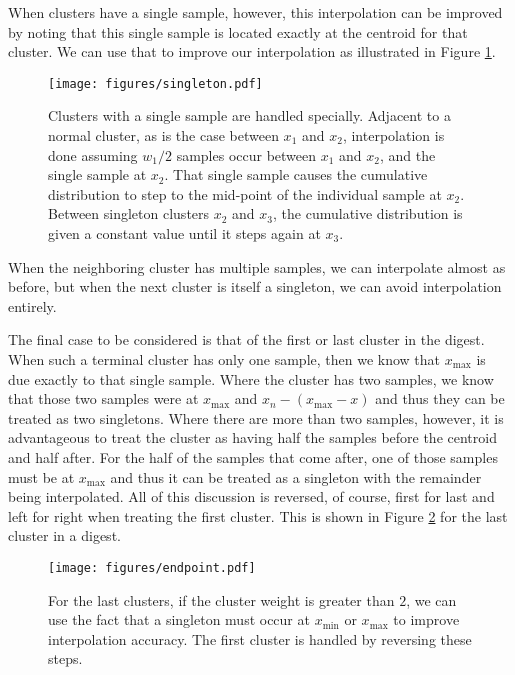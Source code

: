 \documentclass[]{statsoc}
\begin{document}
When clusters have a single sample, however, this interpolation can be improved by noting that this single sample is located exactly at the centroid for that cluster. We can use that to improve our interpolation as illustrated in Figure \ref{fig:singletons}. 
\begin{figure}[tb] %
   \centering
   \texttt{[image: figures/singleton.pdf]} 
   \caption{Clusters with a single sample are handled specially. Adjacent to a normal cluster, as is the case between $x_1$ and $x_2$, interpolation is done assuming $w_1/2$ samples occur between $x_1$ and $x_2$, and the single sample at $x_2$. That single sample causes the cumulative distribution to step to the mid-point of the individual sample at $x_2$. Between singleton clusters $x_2$ and $x_3$, the cumulative distribution is given a constant value until it steps again at $x_3$.}
   \label{fig:singletons}
\end{figure}
When the neighboring cluster has multiple samples, we can interpolate almost as before, but when the next cluster is itself a singleton, we can avoid interpolation entirely. 

The final case to be considered is that of the first or last cluster in the digest. 
When such a terminal cluster has only one sample, then we know that $x_{\mathrm {max}}$ is due exactly to that single sample. Where the cluster has two samples, we know that those two samples were at $x_{\mathrm {max}}$ and $x_n-(x_{\mathrm {max}}-x)$ and thus they can be treated as two singletons. Where there are more than two samples, however, it is advantageous to treat the cluster as having half the samples before the centroid and half after. For the half of the samples that come after, one of those samples must be at $x_{\mathrm {max}}$ and thus it can be treated as a singleton with the remainder being interpolated. All of this discussion is reversed, of course, first for last and left for right when treating the first cluster. This is shown in Figure \ref{fig:endpoint} for the last cluster in a digest.
\begin{figure}[htb] %
   \centering
   \texttt{[image: figures/endpoint.pdf]} 
   \caption{For the last clusters, if the cluster weight is greater than $2$, we can use the fact that a singleton must occur at $x_{\mathrm {min}}$ or $x_{\mathrm {max}}$ to improve interpolation accuracy. The first cluster is handled by reversing these steps.}
   \label{fig:endpoint}
\end{figure}
\end{document}
